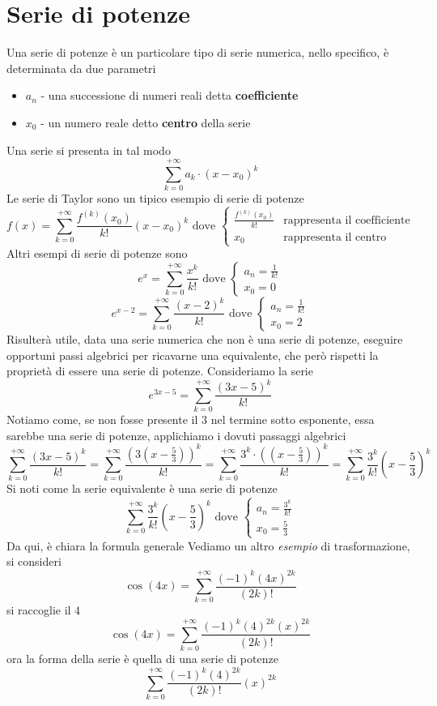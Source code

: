 \documentclass[10pt, letterpaper]{report}
\begin{document}
\section{Serie di potenze}
Una serie di potenze è un particolare tipo di serie numerica, nello specifico, 
è determinata da due parametri\begin{itemize}
    \item $a_n$ - una successione di numeri reali detta \textbf{coefficiente}
    \item $x_0$ - un numero reale detto \textbf{centro} della serie
\end{itemize}
Una serie si presenta in tal modo $$ 
\sum_{k=0}^{+\infty}a_k\cdot(x-x_0)^k
$$
Le serie di Taylor sono un tipico esempio di serie di potenze 
$$ 
f(x)=\displaystyle \sum_{k=0}^{+\infty}\dfrac{f^{(k)}(x_0)}{k!}(x-x_0)^k \text{ dove }
\begin{cases}
    \frac{f^{(k)}(x_0)}{k!} &\text{rappresenta il coefficiente }  \\
    x_0&\text{rappresenta il centro }
 \end{cases}
$$
Altri esempi di serie di potenze sono 
$$ 
e^x=\displaystyle \sum_{k=0}^{+\infty}\dfrac{x^k}{k!} \text{ dove } \begin{cases}
    a_n = \frac{1}{k!}  \\
    x_0 = 0
 \end{cases}
$$
$$
e^{x-2}=\displaystyle \sum_{k=0}^{+\infty}\dfrac{(x-2)^k}{k!} \text{ dove } \begin{cases}
    a_n = \frac{1}{k!}  \\
    x_0 = 2
 \end{cases}
$$
Risulterà utile, data una serie numerica che non è una serie di potenze, eseguire opportuni 
passi algebrici per ricavarne una equivalente, che però rispetti la proprietà di essere una 
serie di potenze.\acc 
Consideriamo la serie 
$$ e^{3x-5}=\displaystyle \sum_{k=0}^{+\infty}\frac{(3x-5)^k}{k!}  $$
Notiamo come, se non fosse presente il $3$ nel termine sotto esponente, essa sarebbe una serie di potenze, 
applichiamo i dovuti passaggi algebrici 
$$\sum_{k=0}^{+\infty}\frac{(3x-5)^k}{k!} =\sum_{k=0}^{+\infty}\frac{(3(x-\frac{5}{3}))^k}{k!} 
=\sum_{k=0}^{+\infty}\frac{3^k\cdot ((x-\frac{5}{3}))^k}{k!} =   
 \sum_{k=0}^{+\infty}\frac{3^k}{k!}(x-\frac{5}{3})^k$$
 Si noti come la serie equivalente è una serie di potenze 
 $$ 
 \displaystyle \sum_{k=0}^{+\infty}\frac{3^k}{k!}(x-\frac{5}{3})^k  \text{ dove } \begin{cases}
    a_n = \frac{3^k}{k!}  \\
    x_0 = \frac{5}{3}
 \end{cases}
 $$
 Da qui, è chiara la formula generale 
 Vediamo un altro \textit{esempio} di trasformazione, si consideri  
 $$ \cos(4x) = \sum_{k=0}^{+\infty}\frac{(-1)^k(4x)^{2k}}{(2k)!}$$
si raccoglie il $4$
 $$  \cos(4x) =\sum_{k=0}^{+\infty}\frac{(-1)^k(4)^{2k}(x)^{2k}}{(2k)!}$$
ora la forma della serie è quella di una serie di potenze
$$ \sum_{k=0}^{+\infty}\frac{(-1)^k(4)^{2k}}{(2k)!}(x)^{2k}$$
\end{document}
